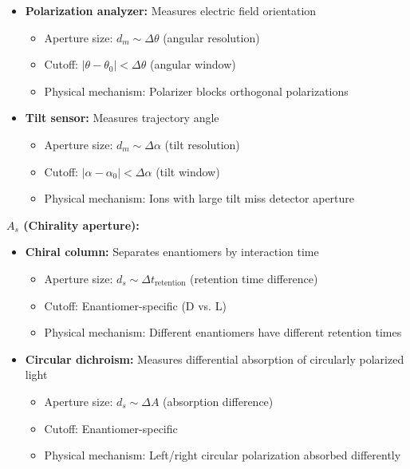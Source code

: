 \begin{proposition}
\begin{itemize}
    \item \textbf{Polarization analyzer:} Measures electric field orientation
        \begin{itemize}
        \item Aperture size: $d_m \sim \Delta\theta$ (angular resolution)
        \item Cutoff: $|\theta - \theta_0| < \Delta\theta$ (angular window)
        \item Physical mechanism: Polarizer blocks orthogonal polarizations
        \end{itemize}
    
    \item \textbf{Tilt sensor:} Measures trajectory angle
        \begin{itemize}
        \item Aperture size: $d_m \sim \Delta\alpha$ (tilt resolution)
        \item Cutoff: $|\alpha - \alpha_0| < \Delta\alpha$ (tilt window)
        \item Physical mechanism: Ions with large tilt miss detector aperture
        \end{itemize}
\end{itemize}

\textbf{$A_s$ (Chirality aperture):}
\begin{itemize}
    \item \textbf{Chiral column:} Separates enantiomers by interaction time
        \begin{itemize}
        \item Aperture size: $d_s \sim \Delta t_{\text{retention}}$ (retention time difference)
        \item Cutoff: Enantiomer-specific (D vs. L)
        \item Physical mechanism: Different enantiomers have different retention times
        \end{itemize}
    
    \item \textbf{Circular dichroism:} Measures differential absorption of circularly polarized light
        \begin{itemize}
        \item Aperture size: $d_s \sim \Delta A$ (absorption difference)
        \item Cutoff: Enantiomer-specific
        \item Physical mechanism: Left/right circular polarization absorbed differently
        \end{itemize}
    

\end{itemize}
\end{proposition}
